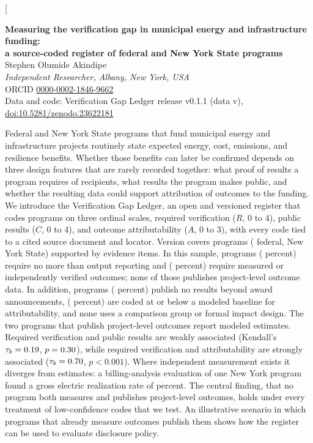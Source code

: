 \documentclass[10pt,twocolumn,letterpaper]{article}
\begin{document}
\twocolumn[{
\begin{center}
{\large\bfseries Measuring the verification gap in municipal energy and infrastructure funding:\\[2pt] a source-coded register of federal and New York State programs}\\[10pt]
{\normalsize Stephen Olumide Akindipe\,\href{https://orcid.org/0000-0002-1846-9662}{}}\\[2pt]
{\small\itshape Independent Researcher, Albany, New York, USA}\\[1pt]
{\small ORCID \href{https://orcid.org/0000-0002-1846-9662}{0000-0002-1846-9662}}\\[1pt]
{\small Data and code: Verification Gap Ledger release v0.1.1 (data v\vglVersion), \href{https://doi.org/10.5281/zenodo.23622181}{doi:10.5281/zenodo.23622181}}\\[8pt]
\begin{minipage}{0.86\textwidth}
\small
Federal and New York State programs that fund municipal energy and infrastructure projects routinely state expected energy, cost, emissions, and resilience benefits. Whether those benefits can later be confirmed depends on three design features that are rarely recorded together: what proof of results a program requires of recipients, what results the program makes public, and whether the resulting data could support attribution of outcomes to the funding. We introduce the Verification Gap Ledger, an open and versioned register that codes programs on three ordinal scales, required verification ($R$, 0 to 4), public results ($C$, 0 to 4), and outcome attributability ($A$, 0 to 3), with every code tied to a cited source document and locator. Version \vglVersion{} covers \nProg{} programs (\nFed{} federal, \nNY{} New York State) supported by \nEvid{} evidence items. In this sample, \nRleOne{} programs (\pctRleOne{} percent) require no more than output reporting and \nRgeThree{} (\pctRgeThree{} percent) require measured or independently verified outcomes; none of those \nRgeThree{} publishes project-level outcome data. In addition, \nCzero{} programs (\pctCzero{} percent) publish no results beyond award announcements, \nAleOne{} (\pctAleOne{} percent) are coded at or below a modeled baseline for attributability, and none uses a comparison group or formal impact design. The two programs that publish project-level outcomes report modeled estimates. Required verification and public results are weakly associated (Kendall's $\tau_b = 0.19$, $p = 0.30$), while required verification and attributability are strongly associated ($\tau_b = 0.70$, $p < 0.001$). Where independent measurement exists it diverges from estimates: a billing-analysis evaluation of one New York program found a gross electric realization rate of \rtemElec{} percent. The central finding, that no program both measures and publishes project-level outcomes, holds under every treatment of low-confidence codes that we test. An illustrative scenario in which programs that already measure outcomes publish them shows how the register can be used to evaluate disclosure policy.\\[4pt]

\end{minipage}
\end{center}}
\end{document}
